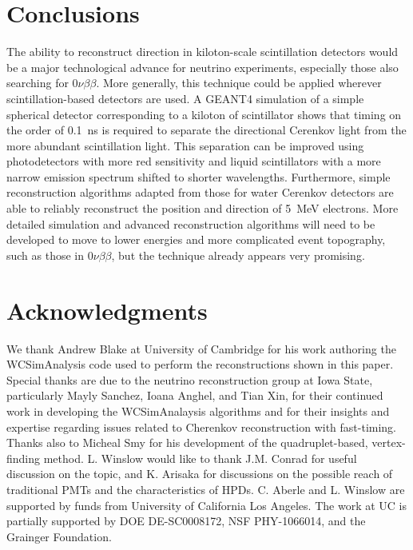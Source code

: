 \documentclass[aps,prc,twocolumn,groupedaddress,showpacs,amsmath,amssymb,floatfix,superscriptaddress]{revtex4}
\newcommand{\GEANT}{GEANT4}
\begin{document}
\section{Conclusions}
The ability to reconstruct direction in kiloton-scale scintillation
detectors would be a major technological advance for neutrino
experiments, especially those also
searching for $0\nu\beta\beta$. More generally, this technique could
be applied wherever scintillation-based detectors are used. A \GEANT
simulation of a simple spherical detector corresponding to a kiloton
of scintillator shows that timing on the order of 0.1~ns is required
to separate the directional Cerenkov light from the more abundant
scintillation light. This separation can be improved using
photodetectors with more red sensitivity and liquid scintillators with
a more narrow emission spectrum shifted to shorter
wavelengths. Furthermore, simple reconstruction algorithms adapted
from those for water Cerenkov detectors are able to reliably
reconstruct the position and direction of 5~MeV electrons. More
detailed simulation and advanced reconstruction algorithms will need
to be developed to move to lower energies and more complicated event
topography, such as those in $0\nu\beta\beta$, but the technique already
appears very promising.


\section{Acknowledgments}
We thank Andrew Blake at University of Cambridge for his work
authoring the WCSimAnalysis code used to perform the reconstructions
shown in this paper. Special thanks are due to the neutrino
reconstruction group at Iowa State, particularly Mayly Sanchez, Ioana
Anghel, and Tian Xin, for their continued work in developing the
WCSimAnalaysis algorithms and for their insights and expertise
regarding issues related to Cherenkov reconstruction with
fast-timing. Thanks also to Micheal Smy for his development of the
quadruplet-based, vertex-finding method. L. Winslow would like to
thank J.M. Conrad for useful discussion on the topic, and K. Arisaka
for discussions on the possible reach of traditional PMTs and the
characteristics of HPDs. C. Aberle and L. Winslow are supported by
funds from University of California Los Angeles. The work at UC is
partially supported by DOE DE-SC0008172, NSF PHY-1066014, and the
Grainger Foundation.

 
\end{document}
